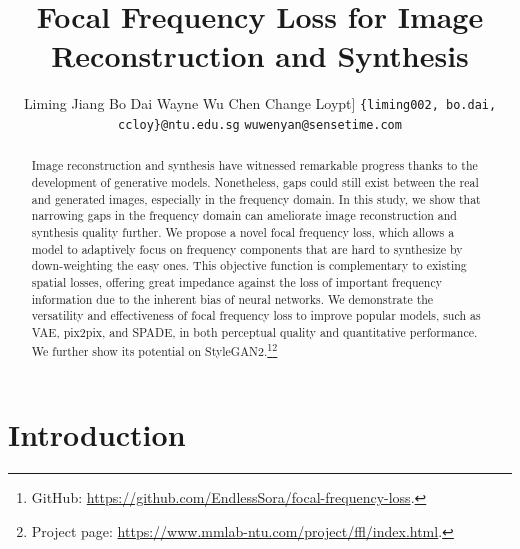 \documentclass[10pt,twocolumn,letterpaper]{article}
\begin{document}
\title{\vspace{-0.1cm}Focal Frequency Loss for Image Reconstruction and Synthesis\vspace{-0.282cm}}

\author{Liming Jiang \hspace{12pt} Bo Dai \hspace{12pt} Wayne Wu \hspace{12pt} Chen Change Loy\1pt]
{\tt\small \{liming002, bo.dai, ccloy\}@ntu.edu.sg} \hspace{12pt}
{\tt\small wuwenyan@sensetime.com}\vspace{-0.15cm}
}

\maketitle





\begin{abstract}
\label{sec:abstract}

Image reconstruction and synthesis have witnessed remarkable progress thanks to the development of generative models.
Nonetheless, gaps could still exist between the real and generated images, especially in the frequency domain.
In this study, we show that narrowing gaps in the frequency domain can ameliorate image reconstruction and synthesis quality further.
We propose a novel focal frequency loss, which allows a model to adaptively focus on frequency components that are hard to synthesize by down-weighting the easy ones.
This objective function is complementary to existing spatial losses, offering great impedance against the loss of important frequency information due to the inherent bias of neural networks.
We demonstrate the versatility and effectiveness of focal frequency loss to improve popular models, such as VAE, pix2pix, and SPADE, in both perceptual quality and quantitative performance. We further show its potential on StyleGAN2.\footnote{\hspace{0.07cm}GitHub: \href{https://github.com/EndlessSora/focal-frequency-loss}{https://github.com/EndlessSora/focal-frequency-loss}.}\footnote{\hspace{0.07cm}Project page: \href{https://www.mmlab-ntu.com/project/ffl/index.html}{https://www.mmlab-ntu.com/project/ffl/index.html}.}


\end{abstract} 

\section{Introduction}
\label{sec:introduction}
\end{document}
